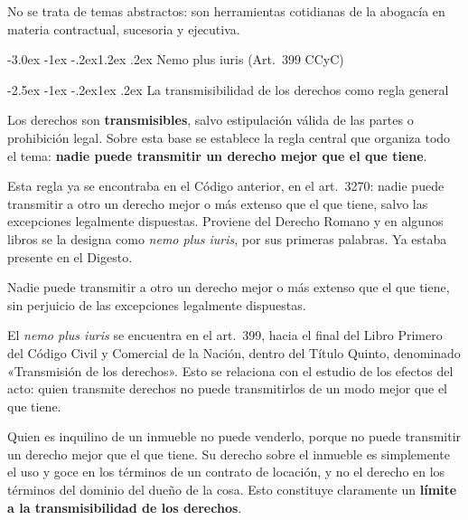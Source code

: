 \documentclass[12pt,oneside]{book}
\makeatletter
\renewcommand\section{\@startsection{section}{1}{\z@}%
  {-3.0ex \@plus -1ex \@minus -.2ex}{1.2ex \@plus .2ex}%
  {\normalfont\large\bfseries\color{acento}}}
\renewcommand\subsection{\@startsection{subsection}{2}{\z@}%
  {-2.5ex \@plus -1ex \@minus -.2ex}{1ex \@plus .2ex}%
  {\normalfont\normalsize\bfseries}}
\makeatother
\begin{document}
No se trata de temas abstractos: son herramientas cotidianas de la abogacía en materia contractual, sucesoria y ejecutiva.

\section{Nemo plus iuris (Art.~399 CCyC)}

\subsection{La transmisibilidad de los derechos como regla general}

Los derechos son \textbf{transmisibles}, salvo estipulación válida de las partes o prohibición legal. Sobre esta base se establece la regla central que organiza todo el tema: \textbf{nadie puede transmitir un derecho mejor que el que tiene}.

Esta regla ya se encontraba en el Código anterior, en el art.~3270: nadie puede transmitir a otro un derecho mejor o más extenso que el que tiene, salvo las excepciones legalmente dispuestas. Proviene del Derecho Romano y en algunos libros se la designa como \textit{nemo plus iuris}, por sus primeras palabras. Ya estaba presente en el Digesto.

\begin{regla}
Nadie puede transmitir a otro un derecho mejor o más extenso que el que tiene, sin perjuicio de las excepciones legalmente dispuestas.
\end{regla}

\begin{nota}
El \textit{nemo plus iuris} se encuentra en el art.~399, hacia el final del Libro Primero del Código Civil y Comercial de la Nación, dentro del Título Quinto, denominado «Transmisión de los derechos». Esto se relaciona con el estudio de los efectos del acto: quien transmite derechos no puede transmitirlos de un modo mejor que el que tiene.
\end{nota}

\begin{ejemplo}
Quien es inquilino de un inmueble no puede venderlo, porque no puede transmitir un derecho mejor que el que tiene. Su derecho sobre el inmueble es simplemente el uso y goce en los términos de un contrato de locación, y no el derecho en los términos del dominio del dueño de la cosa. Esto constituye claramente un \textbf{límite a la transmisibilidad de los derechos}.
\end{ejemplo}
\end{document}
